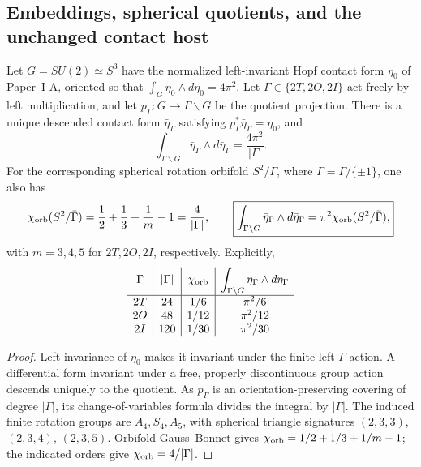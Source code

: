 \documentclass[11pt]{article}
\begin{document}
\subsection{Embeddings, spherical quotients, and the unchanged contact host}
\label{p1b:subsec:v11-quotient-contact}

\begin{theorem}
\label{p1b:thm:v11-quotient-contact}
Let $G=SU(2)\simeq S^3$ have the normalized left-invariant Hopf contact
form $\eta_0$ of Paper~I-A, oriented so that
$\int_G\eta_0\wedge d\eta_0=4\pi^2$.  Let
$\Gamma\in\{2T,2O,2I\}$ act freely by left multiplication, and let
$p_\Gamma:G\to\Gamma\backslash G$ be the quotient projection.  There is
a unique descended contact form $\bar\eta_\Gamma$ satisfying
$p_\Gamma^*\bar\eta_\Gamma=\eta_0$, and
\[
\boxed{\int_{\Gamma\backslash G}\bar\eta_\Gamma\wedge
 d\bar\eta_\Gamma=\frac{4\pi^2}{|\Gamma|}.}
\]
For the corresponding spherical rotation orbifold
$S^2/\bar\Gamma$, where $\bar\Gamma=\Gamma/\{\pm1\}$, one also has
\[
\chi_{\rm orb}(S^2/\bar\Gamma)
 =\frac12+\frac13+\frac1m-1=\frac4{|\Gamma|},
\qquad
\boxed{\int_{\Gamma\backslash G}\bar\eta_\Gamma\wedge
 d\bar\eta_\Gamma=\pi^2\chi_{\rm orb}(S^2/\bar\Gamma),}
\]
with $m=3,4,5$ for $2T,2O,2I$, respectively.  Explicitly,
\[
\begin{array}{c|c|c|c}
\Gamma&|\Gamma|&\chi_{\rm orb}&\displaystyle
 \int_{\Gamma\backslash G}\bar\eta_\Gamma\wedge d\bar\eta_\Gamma\\\hline
2T&24&1/6&\pi^2/6\\
2O&48&1/12&\pi^2/12\\
2I&120&1/30&\pi^2/30
\end{array}
\]
\end{theorem}
\begin{proof}
Left invariance of $\eta_0$ makes it invariant under the finite left
$\Gamma$ action.  A differential form invariant under a free, properly
discontinuous group action descends uniquely to the quotient.  As
$p_\Gamma$ is an orientation-preserving covering of degree $|\Gamma|$,
its change-of-variables formula divides the integral by $|\Gamma|$.
The induced finite rotation groups are $A_4,S_4,A_5$, with spherical
triangle signatures $(2,3,3)$, $(2,3,4)$, $(2,3,5)$.  Orbifold
Gauss--Bonnet gives
$\chi_{\rm orb}=1/2+1/3+1/m-1$; the indicated
orders give $\chi_{\rm orb}=4/|\Gamma|$.
\end{proof}
\end{document}
